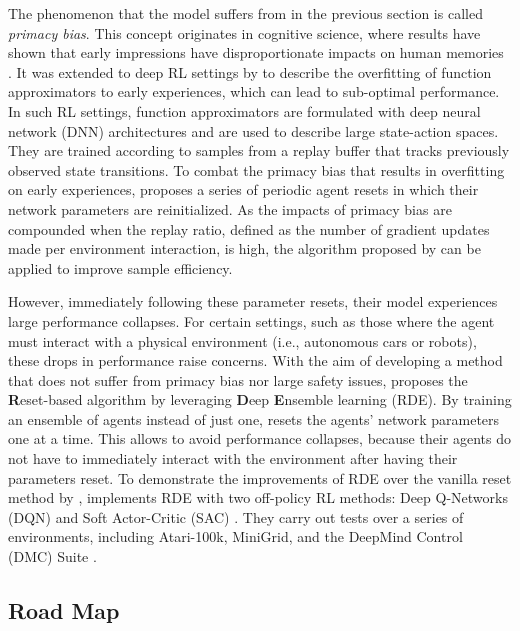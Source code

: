 \documentclass[base]{subfiles}
\begin{document}
The phenomenon that the model suffers from in the previous section is called \textit{primacy bias}. 
This concept originates in cognitive science, where results have shown that early impressions have disproportionate impacts on human memories \cite{cogsci}.
It was extended to deep RL settings by \cite{nikishin2022} to describe the overfitting of function approximators to early experiences, which can lead to sub-optimal performance.
In such RL settings, function approximators are formulated with deep neural network (DNN) architectures and are used to describe large state-action spaces. 
They are trained according to samples from a replay buffer that tracks previously observed state transitions.
To combat the primacy bias that results in overfitting on early experiences, \cite{nikishin2022} proposes a series of periodic agent resets in which their network parameters are reinitialized. 
As the impacts of primacy bias are compounded when the replay ratio, defined as the number of gradient updates made per environment interaction, is high, the algorithm proposed by \cite{nikishin2022} can be applied to improve sample efficiency.

However, immediately following these parameter resets, their model experiences large performance collapses. 
For certain settings, such as those where the agent must interact with a physical environment (i.e., autonomous cars or robots), these drops in performance raise concerns.
With the aim of developing a method that does not suffer from primacy bias nor large safety issues, \cite{kim2023} proposes the \textbf{R}eset-based algorithm by leveraging \textbf{D}eep \textbf{E}nsemble learning (RDE). 
By training an ensemble of agents instead of just one, \cite{kim2023} resets the agents' network parameters one at a time. 
This allows \cite{kim2023} to avoid performance collapses, because their agents do not have to immediately interact with the environment after having their parameters reset.
To demonstrate the improvements of RDE over the vanilla reset method by \cite{nikishin2022}, \cite{kim2023} implements RDE with two off-policy RL methods: Deep Q-Networks (DQN) and Soft Actor-Critic (SAC) \cite{minh2015, sac}. 
They carry out tests over a series of environments, including Atari-100k, MiniGrid, and the DeepMind Control (DMC) Suite \cite{atari, minigrid, dmc}. 

\subsection{Road Map}
\end{document}
